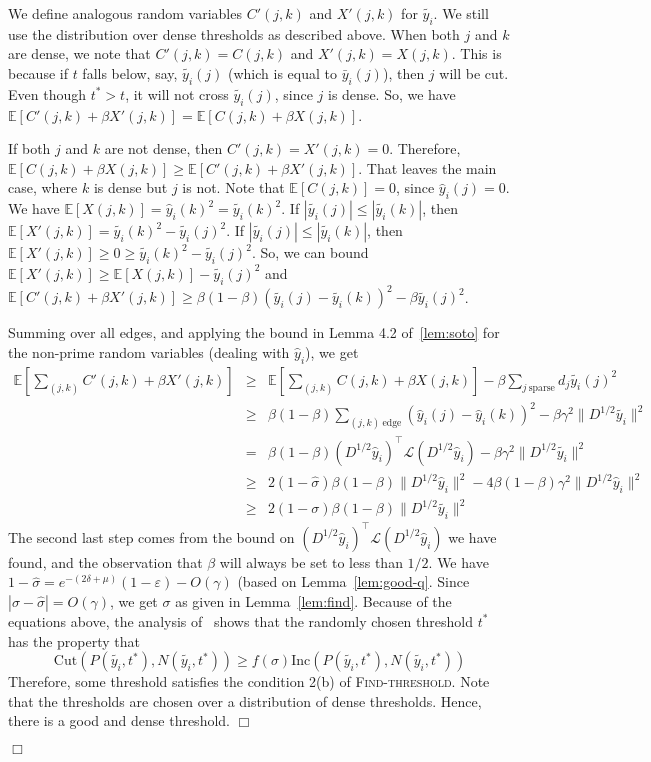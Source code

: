 \documentclass[11pt]{article}
\newenvironment{myproof}{\noindent {\sc Proof:}}{$\Box$}
\newcommand\E{{\mathbb{E}}}
\def\epsilon{\varepsilon}
\def\lap{{\mathcal L}}
\newcommand\qhi{\widehat{y}_i}
\newcommand\qbi{\bar{y}_i}
\newcommand\qti{\widetilde{y_i}}
\newcommand\inc{\textrm{Inc}}
\newcommand\cut{\textrm{Cut}}
\newcommand\Find{\textsc{Find-threshold}\xspace}
\newcommand\soto{f\xspace}
\def\Dhalf{D^{1/2}}
\begin{document}
\begin{myproof}
\begin{myproof}
We define analogous random variables $C'(j,k)$ and $X'(j,k)$ for $\qti$.
We still use the distribution over dense thresholds
as described above. When both $j$ and $k$ are dense,
we note that $C'(j,k) = C(j,k)$ and $X'(j,k) = X(j,k)$.
This is because if $t$ falls below, say, $\qti(j)$ (which is equal to
$\qbi(j)$), then $j$ will be cut. Even though $t^* > t$,
it will not cross $\qti(j)$, since $j$ is dense.
So, we have $\E[C'(j,k) + \beta X'(j,k)] = \E[C(j,k) + \beta X(j,k)]$.

If both $j$ and $k$ are not dense, then $C'(j,k) = X'(j,k) = 0$.
Therefore, $\E[C(j,k) + \beta X(j,k)] \geq \E[C'(j,k) + \beta X'(j,k)]$.
That leaves the main case, where $k$ is dense but $j$ is not.
Note that $\E[C(j,k)] = 0$, since $\qhi(j) = 0$.
We have $\E[X(j,k)] = \qhi(k)^2 = \qti(k)^2$.
If $|\qti(j)| \leq |\qti(k)|$, then
$\E[X'(j,k)] = \qti(k)^2 - \qti(j)^2$.
If $|\qti(j)| \leq |\qti(k)|$, then
$\E[X'(j,k)] \geq 0 \geq \qti(k)^2 - \qti(j)^2$.
So, we can bound $\E[X'(j,k)] \geq \E[X(j,k)] - \qti(j)^2$
and $\E[C'(j,k) + \beta X'(j,k)] \geq \beta(1-\beta)(\qti(j) - \qti(k))^2 - \beta \qti(j)^2$.

Summing over all edges, and applying the bound in Lemma 4.2 of~\ref{lem:soto}
for the non-prime random variables (dealing with $\qhi$), we get
\begin{eqnarray*}
\E[\sum_{(j,k)} C'(j,k) + \beta X'(j,k)]
& \geq & \E[\sum_{(j,k)} C(j,k) + \beta X(j,k)] - \beta \sum_{j \ \textrm{sparse}} d_j\qti(j)^2\\
& \geq & \beta (1-\beta) \sum_{(j,k) \ \textrm{edge}} (\qhi(j)-\qhi(k))^2 - \beta \gamma^2\|\Dhalf \qti\|^2 \\
& = & \beta (1-\beta) (\Dhalf\qhi)^\top \lap (\Dhalf\qhi) - \beta \gamma^2\|\Dhalf \qti\|^2 \\
& \geq & 2(1-\hat{\sigma}) \beta (1-\beta) \|\Dhalf \qhi\|^2 - 4\beta(1-\beta) \gamma^2 \|\Dhalf \qhi\|^2 \\
& \geq & 2(1-\sigma) \beta (1-\beta) \|\Dhalf \qti\|^2
\end{eqnarray*}
The second last step comes from the bound on $(\Dhalf\qhi)^\top \lap (\Dhalf\qhi)$ we have found,
and the observation that $\beta$ will always be set to less than $1/2$.
We have $1 - \hat{\sigma} = e^{-(2\delta+\mu)}(1-\epsilon) - O(\gamma)$ (based on Lemma~\ref{lem:good-q}.
Since $|\sigma - \hat{\sigma}| = O(\gamma)$, we get $\sigma$ as given
in Lemma~\ref{lem:find}. Because of the equations above, the analysis
of~\cite{Sot09} shows that the randomly chosen threshold $t^*$
has the property that
$$ \cut(P(\qti,t^*),N(\qti,t^*)) \geq \soto(\sigma)\inc(P(\qti,t^*),N(\qti,t^*))$$
Therefore, some threshold satisfies the condition 2(b) of {\Find}.
Note that the thresholds are chosen over a distribution of dense
thresholds. Hence, there is a good and dense threshold.
\end{myproof}

\end{myproof}
\end{document}

